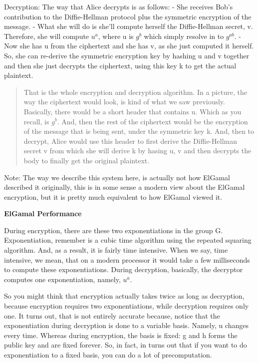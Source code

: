 \documentclass[11pt]{article}
\begin{document}
Decryption: The way that Alice decrypts is as follows: - She receives
Bob's contribution to the Diffie-Hellman protocol plus the symmetric
encryption of the message. - What she will do is she'll compute herself
the Diffie-Hellman secret, v. Therefore, she will compute \(u^{a}\),
where u is \(g^{b}\) which simply resolve in to \(g^{ab}\). - Now she
has u from the ciphertext and she has v, as she just computed it
herself. So, she can re-derive the symmetric encryption key by hashing u
and v together and then she just decrypts the ciphertext, using this key
k to get the actual plaintext.

\begin{quote}
That is the whole encryption and decryption algorithm. In a picture, the
way the ciphertext would look, is kind of what we saw previously.
Basically, there would be a short header that contains u. Which as you
recall, is \(g^{b}\). And, then the rest of the ciphertext would be the
encryption of the message that is being sent, under the symmetric key k.
And, then to decrypt, Alice would use this header to first derive the
Diffie-Hellman secret v from which she will derive k by hasing u, v and
then decrypts the body to finally get the original plaintext.
\end{quote}

Note: The way we describe this system here, is actually not how ElGamal
described it originally, this is in some sense a modern view about the
ElGamal encryption, but it is pretty much equivalent to how ElGamal
viewed it.

\textbf{ElGamal Performance}

During encryption, there are these two exponentiations in the group G.
Exponentiation, remember is a cubic time algorithm using the repeated
squaring algorithm. And, as a result, it is fairly time intensive. When
we say, time intensive, we mean, that on a modern processor it would
take a few milliseconds to compute these exponentiations. During
decryption, basically, the decryptor computes one exponentiation,
namely, \(u^{a}\).

So you might think that encryption actually takes twice as long as
decryption, because encryption requires two exponentiations, while
decryption requires only one. It turns out, that is not entirely
accurate because, notice that the exponentiation during decryption is
done to a variable basis. Namely, u changes every time. Whereas during
encryption, the basis is fixed: g and h forms the public key and are
fixed forever. So, in fact, in turns out that if you want to do
exponentiation to a fixed basis, you can do a lot of precomputation.
\end{document}
